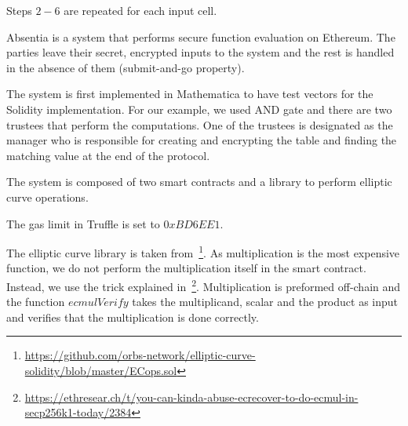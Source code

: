 


Steps $2-6$ are repeated for each input cell.

Absentia is a system that performs secure function evaluation on Ethereum. The parties leave their secret, encrypted inputs to the system and the rest is handled in the absence of them (submit-and-go property).

The system is first implemented in Mathematica to have test vectors for the Solidity implementation. For our example, we used AND gate and there are two trustees that perform the computations. One of the trustees is designated as the manager who is responsible for creating and encrypting the table and finding the matching value at the end of the protocol.

The system is composed of two smart contracts and a library to perform elliptic curve operations.

The gas limit in Truffle is set to $0xBD6EE1$.

The elliptic curve library is taken from~\footnote{\url{https://github.com/orbs-network/elliptic-curve-solidity/blob/master/ECops.sol}}. As multiplication is the most expensive function, we do not perform the multiplication itself in the smart contract. Instead, we use the trick explained in~\footnote{\url{https://ethresear.ch/t/you-can-kinda-abuse-ecrecover-to-do-ecmul-in-secp256k1-today/2384}}. Multiplication is preformed off-chain and the function $ecmulVerify$ takes the multiplicand, scalar and the product as input and verifies that the multiplication is done correctly.

